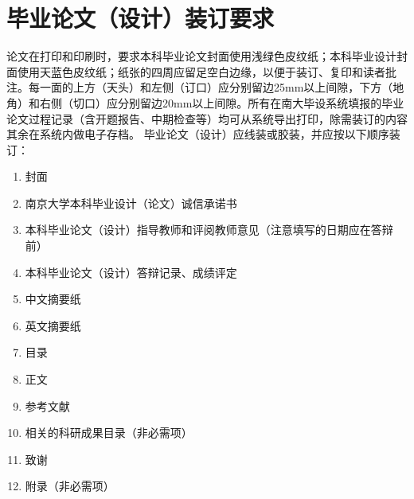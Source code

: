 \section{毕业论文（设计）装订要求}
论文在打印和印刷时，要求本科毕业论文封面使用浅绿色皮纹纸；本科毕业设计封面使用天蓝色皮纹纸；纸张的四周应留足空白边缘，以便于装订、复印和读者批注。每一面的上方（天头）和左侧（订口）应分别留边25mm以上间隙，下方（地角）和右侧（切口）应分别留边20mm以上间隙。所有在南大毕设系统填报的毕业论文过程记录（含开题报告、中期检查等）均可从系统导出打印，除需装订的内容其余在系统内做电子存档。
毕业论文（设计）应线装或胶装，并应按以下顺序装订：
\begin{enumerate}
    \item 封面
    \item 南京大学本科毕业设计（论文）诚信承诺书
    \item 本科毕业论文（设计）指导教师和评阅教师意见（注意填写的日期应在答辩前）
    \item 本科毕业论文（设计）答辩记录、成绩评定
    \item 中文摘要纸
    \item 英文摘要纸
    \item 目录
    \item 正文
    \item 参考文献
    \item 相关的科研成果目录（非必需项）
    \item 致谢
    \item 附录（非必需项）
\end{enumerate}
